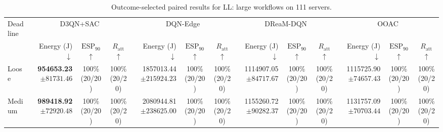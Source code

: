 \documentclass[10pt]{article}
\begin{document}
\begin{table}[!htbp]
\centering
\caption{Outcome-selected paired results for LL: large workflows on 111 servers.}
\label{tab:conditional_case_ll}
\begingroup
\footnotesize
\setlength{\tabcolsep}{2.2pt}
\renewcommand{\arraystretch}{1.08}
\begin{tabular}{@{}l*{4}{rcc}@{}}
\toprule
Deadline & \multicolumn{3}{c}{D3QN+SAC} & \multicolumn{3}{c}{DQN-Edge} & \multicolumn{3}{c}{DReaM-DQN} & \multicolumn{3}{c}{OOAC} \\
\cmidrule(lr){2-4}\cmidrule(lr){5-7}\cmidrule(lr){8-10}\cmidrule(lr){11-13}
 & Energy (J) $\downarrow$ & $\mathrm{ESP}_{90}$ $\uparrow$ & $R_{\mathrm{att}}$ $\uparrow$ & Energy (J) $\downarrow$ & $\mathrm{ESP}_{90}$ $\uparrow$ & $R_{\mathrm{att}}$ $\uparrow$ & Energy (J) $\downarrow$ & $\mathrm{ESP}_{90}$ $\uparrow$ & $R_{\mathrm{att}}$ $\uparrow$ & Energy (J) $\downarrow$ & $\mathrm{ESP}_{90}$ $\uparrow$ & $R_{\mathrm{att}}$ $\uparrow$ \\
\midrule
Loose & \shortstack[r]{\textbf{954653.23}\\$\pm 81731.46$} & \shortstack[c]{100\%\\(20/20)} & \shortstack[c]{100\%\\(20/20)} & \shortstack[r]{1857013.44\\$\pm 215924.23$} & \shortstack[c]{100\%\\(20/20)} & \shortstack[c]{100\%\\(20/20)} & \shortstack[r]{1114907.05\\$\pm 84717.67$} & \shortstack[c]{100\%\\(20/20)} & \shortstack[c]{100\%\\(20/20)} & \shortstack[r]{1115725.90\\$\pm 74657.43$} & \shortstack[c]{100\%\\(20/20)} & \shortstack[c]{100\%\\(20/20)} \\
Medium & \shortstack[r]{\textbf{989418.92}\\$\pm 72920.48$} & \shortstack[c]{100\%\\(20/20)} & \shortstack[c]{100\%\\(20/20)} & \shortstack[r]{2080944.81\\$\pm 238625.00$} & \shortstack[c]{100\%\\(20/20)} & \shortstack[c]{100\%\\(20/20)} & \shortstack[r]{1155260.72\\$\pm 90282.37$} & \shortstack[c]{100\%\\(20/20)} & \shortstack[c]{100\%\\(20/20)} & \shortstack[r]{1131757.09\\$\pm 70703.44$} & \shortstack[c]{100\%\\(20/20)} & \shortstack[c]{100\%\\(20/20)} \\

\end{tabular}
\end{table}
\end{document}
